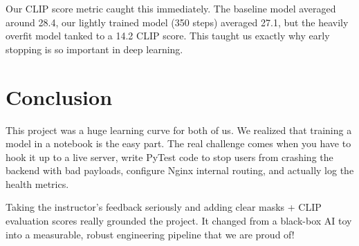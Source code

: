 \documentclass[11pt,a4paper]{article}
\begin{document}
Our CLIP score metric caught this immediately. The baseline model averaged around 28.4, our lightly trained model (350 steps) averaged 27.1, but the heavily overfit model tanked to a 14.2 CLIP score. This taught us exactly why early stopping is so important in deep learning.

\section{Conclusion}

This project was a huge learning curve for both of us. We realized that training a model in a notebook is the easy part. The real challenge comes when you have to hook it up to a live server, write PyTest code to stop users from crashing the backend with bad payloads, configure Nginx internal routing, and actually log the health metrics.

Taking the instructor's feedback seriously and adding clear masks + CLIP evaluation scores really grounded the project. It changed from a black-box AI toy into a measurable, robust engineering pipeline that we are proud of!
\end{document}
